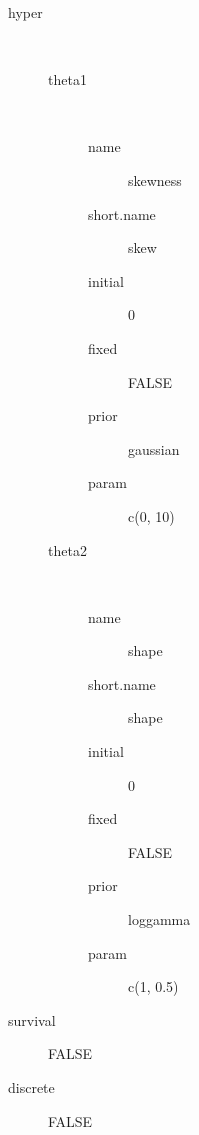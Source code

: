 \begin{description}
	\item[hyper]\ 
	 \begin{description}
	 	\item[theta1]\ 
	 	 \begin{description}
	 	 	 \item[ name ] skewness 
	 	 	 \item[ short.name ] skew 
	 	 	 \item[ initial ] 0 
	 	 	 \item[ fixed ] FALSE 
	 	 	 \item[ prior ] gaussian 
	 	 	 \item[ param ] c(0, 10) 
	 	 \end{description}
	 	\item[theta2]\ 
	 	 \begin{description}
	 	 	 \item[ name ] shape 
	 	 	 \item[ short.name ] shape 
	 	 	 \item[ initial ] 0 
	 	 	 \item[ fixed ] FALSE 
	 	 	 \item[ prior ] loggamma 
	 	 	 \item[ param ] c(1, 0.5) 
	 	 \end{description}
	 \end{description}
	 \item[ survival ] FALSE 
	 \item[ discrete ] FALSE 
\end{description}
